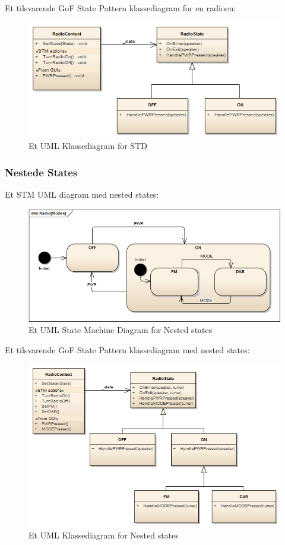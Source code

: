 Et tilsvarende GoF State Pattern klassediagram for en radioen:

\begin{figure}[H]
	\centering
	\includegraphics[width=0.8\linewidth]{figs/state/Radio_StatePattern}
	\caption{Et UML Klassediagram for STD}
	\label{fig:UMLclassState}
\end{figure}

\subsubsection{Nestede States}

Et STM UML diagram med nested states:

\begin{figure}[H]
	\centering
	\includegraphics[width=0.9\linewidth]{figs/state/Radio[Modes]_STM}
	\caption{Et UML State Machine Diagram for Nested states}
	\label{fig:UMLNestedState}
\end{figure}

Et tilsvarende GoF State Pattern klassediagram med nested states:

\begin{figure}[H]
	\centering
	\includegraphics[width=0.9\linewidth]{figs/state/RadioNeted_SP}
	\caption{Et UML Klassediagram for Nested states}
	\label{fig:UMLClassNestedState}
\end{figure}

